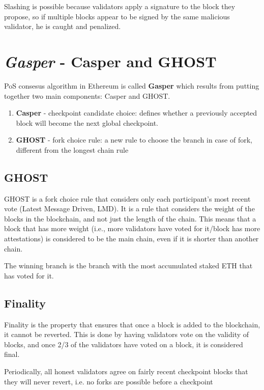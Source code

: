 Slashing is possible because validators apply a signature to the block they propose, so if multiple blocks appear to be signed by the same malicious validator, he is caught and penalized.

\section{\textit{Gasper} - Casper and GHOST}
PoS consesus algorithm in Ethereum is called \textbf{Gasper} which results from putting together two main components: Casper and GHOST.
\begin{enumerate}
   \item \textbf{Casper} - checkpoint candidate choice:
   defines whether a previously accepted block will become the next global checkpoint.
   \item \textbf{GHOST} - fork choice rule:
   a new rule to choose the branch in case of fork, different from the longest chain rule
\end{enumerate}

\subsection{GHOST}
GHOST is a fork choice rule that considers only each participant's most recent vote (Latest Message Driven, LMD). It is a rule that considers the weight of the blocks in the blockchain, and not just the length of the chain. This means that a block that has more weight (i.e., more validators have voted for it/block has more attestations) is considered to be the main chain, even if it is shorter than another chain.

The winning branch is the branch with the most accumulated staked ETH that has voted for it.

\subsection{Finality}
Finality is the property that ensures that once a block is added to the blockchain, it cannot be reverted. This is done by having validators vote on the validity of blocks, and once 2/3 of the validators have voted on a block, it is considered final.


Periodically, all honest validators agree on fairly recent checkpoint blocks that they will never revert, i.e. no forks are possible before a checkpoint